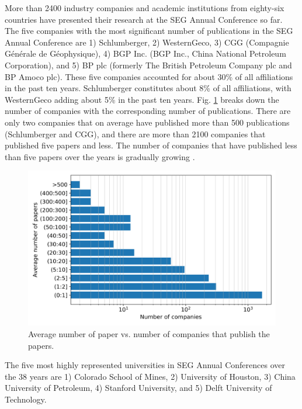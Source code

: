 \documentclass[energies,article,submit,moreauthors,pdftex]{Definitions/mdpi}
\begin{document}
More than 2400 industry companies and academic institutions from eighty-six countries have presented their research at the SEG Annual Conference so far. The five companies with the most significant number of publications in the SEG Annual Conference are 1) Schlumberger, 2) WesternGeco, 3) CGG (Compagnie Générale de Géophysique), 4) BGP Inc. (BGP Inc., China National Petroleum Corporation), and 5) BP plc (formerly The British Petroleum Company plc and BP Amoco plc). These five companies accounted for about 30\% of all affiliations in the past ten years. Schlumberger constitutes about 8\% of all affiliations, with WesternGeco adding about 5\% in the past ten years. Fig. \ref{companies_hist} breaks down the number of companies with the corresponding number of publications. There are only two companies that on average have published more than 500 publications (Schlumberger and CGG), and there are more than 2100 companies that published five papers and less. The number of companies that have published less than five papers over the years is gradually growing \citep{Eltsov2020}. 


\begin{figure}[ht!]
\centering
\includegraphics[scale=0.7]{companies_hist.png}
\caption{Average number of paper vs. number of companies that publish the papers.}
\label{companies_hist}
\end{figure} 
 
The five most highly represented universities in SEG Annual Conferences over the 38 years are 1) Colorado School of Mines, 2) University of Houston, 3) China University of Petroleum, 4) Stanford University, and 5) Delft University of Technology. 
\end{document}
